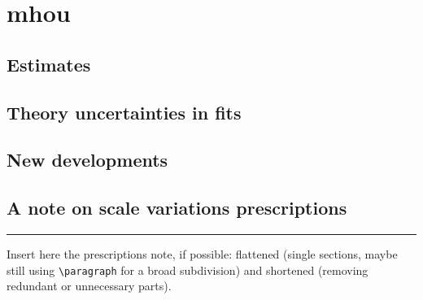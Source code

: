 
\chapter[Missing Higher Order uncertainties]{\acrlong*{mhou}}
\label{ch:mhou}
\minitoc
\adjustmtc



\section{Estimates}
\label{sec:mhou/estimates}


\section{Theory uncertainties in \pdf fits}
\label{sec:mhou/pdf}


\section{New developments}
\label{sec:mhou/new}


\section{A note on scale variations prescriptions}
\label{sec:mhou/prescriptions}


\vspace*{20pt}
\noindent
\rule{\hsize}{1pt}

Insert here the prescriptions note, if possible: flattened (single sections,
maybe still using \lstinline{\paragraph} for a broad subdivision) and shortened
(removing redundant or unnecessary parts).
